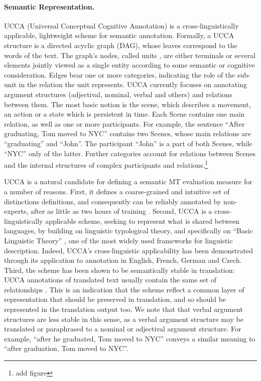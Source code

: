 \documentclass[11pt]{article}
\newcommand{\oa}[1]{\footnote{\color{red} #1}}
\begin{document}
\paragraph{Semantic Representation.}
UCCA (Universal Conceptual Cognitive Annotation) is a cross-linguistically applicable, lightweight
scheme for semantic annotation. Formally, a UCCA structure is a directed acyclic graph (DAG),
whose leaves correspond to the words of the text.
The graph’s nodes, called {\sc units} , are either terminals or several elements jointly
viewed as a single entity according to some semantic or cognitive consideration. Edges bear one
or more categories, indicating the role of the sub-unit in the relation the unit represents. UCCA
currently focuses on annotating argument structures (adjectival, nominal, verbal and others) and
relations between them. The most basic notion is the {\sc scene}, which describes a movement, an
action or a state which is persistent in time. Each Scene contains one main relation, as well
as one or more participants. For example, the sentence ``After graduating, Tom moved to NYC''
contains two Scenes, whose main relations are ``graduating'' and ``John''. The participant ``John''
is a part of both Scenes, while ``NYC'' only of the latter. Further categories account for
relations between Scenes and the internal structures of complex participants and relations.\oa{add figure}

UCCA is a natural candidate for defining a semantic
MT evaluation measure for a number of reasons. 
First, it defines a coarse-grained and intuitive set of distinctions definitions,
and consequently can be reliably annotated by non-experts, after as little as two hours
of training \cite{marinotti2014}.
Second, UCCA is a cross-linguistically applicable scheme, seeking to represent what is shared between languages,
by building on linguistic typological theory, and specifically on ``Basic Linguistic Theory''
\cite{Dixon:10a,Dixon:10b,Dixon:12}, one of the most widely used frameworks for linguistic description.
Indeed, UCCA's cross-linguistic applicability has been demonstrated through its
application to annotation in English, French, German and Czech. 
Third, the scheme has been shown to be semantically stable
in translation: UCCA annotations of translated text usually contain the same set of relationships
\cite{sulem2012}. This is an indication that the scheme reflect a common layer of representation that
should be preserved in translation, and so should be represented in the translation output too.
We note that that verbal argument structures are less stable in this sense, as a verbal
argument structure may be translated or paraphrased to a nominal or adjectival
argument structure. For example, ``after he graduated, Tom moved to NYC'' conveys a similar meaning
to ``after graduation, Tom moved to NYC''. 
\end{document}
